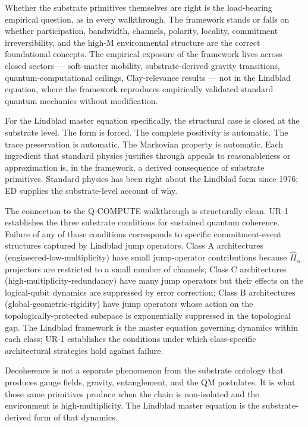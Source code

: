 \documentclass[11pt,a4paper]{article}
\begin{document}
Whether the substrate primitives themselves are right is the load-bearing empirical question, as in every walkthrough. The framework stands or falls on whether participation, bandwidth, channels, polarity, locality, commitment irreversibility, and the high-M environmental structure are the correct foundational concepts. The empirical exposure of the framework lives across closed sectors --- soft-matter mobility, substrate-derived gravity transitions, quantum-computational ceilings, Clay-relevance results --- not in the Lindblad equation, where the framework reproduces empirically validated standard quantum mechanics without modification.

For the Lindblad master equation specifically, the structural case is closed at the substrate level. The form is forced. The complete positivity is automatic. The trace preservation is automatic. The Markovian property is automatic. Each ingredient that standard physics justifies through appeals to reasonableness or approximation is, in the framework, a derived consequence of substrate primitives. Standard physics has been right about the Lindblad form since 1976; ED supplies the substrate-level account of why.

The connection to the Q-COMPUTE walkthrough is structurally clean. UR-1 establishes the three substrate conditions for sustained quantum coherence. Failure of any of those conditions corresponds to specific commitment-event structures captured by Lindblad jump operators. Class A architectures (engineered-low-multiplicity) have small jump-operator contributions because $\hat\Pi_\alpha$ projectors are restricted to a small number of channels; Class C architectures (high-multiplicity-redundancy) have many jump operators but their effects on the logical-qubit dynamics are suppressed by error correction; Class B architectures (global-geometric-rigidity) have jump operators whose action on the topologically-protected subspace is exponentially suppressed in the topological gap. The Lindblad framework is the master equation governing dynamics within each class; UR-1 establishes the conditions under which class-specific architectural strategies hold against failure.

Decoherence is not a separate phenomenon from the substrate ontology that produces gauge fields, gravity, entanglement, and the QM postulates. It is what those same primitives produce when the chain is non-isolated and the environment is high-multiplicity. The Lindblad master equation is the substrate-derived form of that dynamics.
\end{document}
